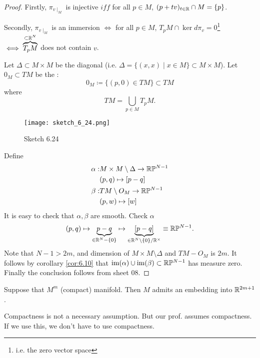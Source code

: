 \begin{proof}
    Firstly, \(\pi_{v\mid_M}\) is injective \(iff\) for all 
    \(p\in M\), \((p+tv)_{t\in\mathbb{R}}\cap M = \{p\}\). 
    
    Secondly,
    \(\pi_{v\mid_M}\) is an immersion \(\iff\) for all \(p\in M\), \(T_pM\cap \ker d\pi_v=0\)\footnote{i.e. the zero vector space}
    \(\iff \overbrace{T_pM}^{\subset\mathbb{R}^N}\) does not contain \(v\).

    Let \(\Delta\subset M\times M\) be the diagonal (i.e. \(\Delta=\{(x,x)\mid x\in M\}\subset M\times M\)). Let 
    \(0_M\subset TM\) be the : 
    \[0_M\coloneqq \{(p,0)\in TM\}\subset TM\]
    where \[TM=\bigcup_{p\in M} T_p M.\]
    \begin{figure}[H]\label{fig:6.24}
        \centering
        \texttt{[image: sketch\_6\_24.png]}
        \caption{Sketch 6.24}
    \end{figure}
    Define \begin{align*} %
        \alpha:& M\times M \setminus \Delta \to  \R\bP^{N-1}\\
        &(p,q)\mapsto [p-q]\\
        \beta:& TM\setminus O_M\to \R\bP^{N-1}\\
        &(p,w)\mapsto  [w]
    \end{align*}
    It is easy to check that \(\alpha,\beta\) are smooth. Check \(\alpha\)
    \begin{align*}
        (p,q)\mapsto \underbrace{p-q}_{\in\mathbb{R}^{N}-\{0\}}\mapsto \underbrace{[p-q]}_{\in\mathbb{R}^N\setminus \{0\}/\mathbb{R}^\times}\equiv \mathbb{R}\mathbb{P}^{N-1}.
    \end{align*}
    Note that \(N-1>2m\), and dimension of \(M\times M\setminus\Delta\) and \(TM-O_M\) is \(2m\).
    It follows by corollary \ref{cor:6.10} that \(\text{im}(\alpha)\cup\text{im}(\beta)\subset \mathbb{R} \mathbb{P}^{N-1}\) has measure zero.
    Finally the conclusion follows from sheet 08.
\end{proof}

\begin{corollary}\label{cor:6.12:strong_whitney}
    Suppose that \(M^m\) (compact) manifold. Then \(M\) admits an embedding into \(\mathbb{R}^{2m+1}\).
\end{corollary}

\begin{remark}
    Compactness is not a necessary assumption. But our prof. assumes compactness. If we use this, we don't have to use compactness.
\end{remark}

